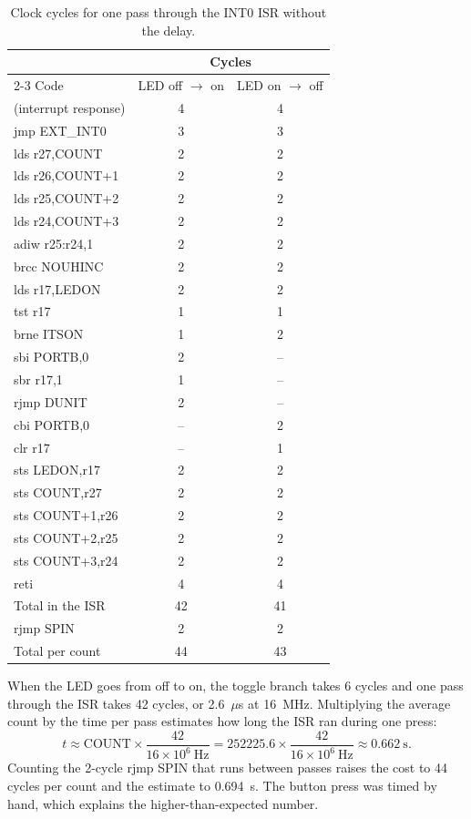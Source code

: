 \documentclass[11pt]{article}
\begin{document}
\begin{table}[H]
  \centering
  \caption{Clock cycles for one pass through the INT0 ISR without the delay.}
  \label{tab:isr}
  \begin{tabular}{lcc}
    \toprule
    & \multicolumn{2}{c}{Cycles} \\
    \cmidrule(l){2-3}
    Code & LED off $\to$ on & LED on $\to$ off \\
    \midrule
    (interrupt response) & 4 & 4 \\
    jmp EXT\_INT0 & 3 & 3 \\
    lds r27,COUNT & 2 & 2 \\
    lds r26,COUNT+1 & 2 & 2 \\
    lds r25,COUNT+2 & 2 & 2 \\
    lds r24,COUNT+3 & 2 & 2 \\
    adiw r25:r24,1 & 2 & 2 \\
    brcc NOUHINC & 2 & 2 \\
    lds r17,LEDON & 2 & 2 \\
    tst r17 & 1 & 1 \\
    brne ITSON & 1 & 2 \\
    sbi PORTB,0 & 2 & -- \\
    sbr r17,1 & 1 & -- \\
    rjmp DUNIT & 2 & -- \\
    cbi PORTB,0 & -- & 2 \\
    clr r17 & -- & 1 \\
    sts LEDON,r17 & 2 & 2 \\
    sts COUNT,r27 & 2 & 2 \\
    sts COUNT+1,r26 & 2 & 2 \\
    sts COUNT+2,r25 & 2 & 2 \\
    sts COUNT+3,r24 & 2 & 2 \\
    reti & 4 & 4 \\
    \midrule
    Total in the ISR & 42 & 41 \\
    rjmp SPIN & 2 & 2 \\
    \midrule
    Total per count & 44 & 43 \\
    \bottomrule
  \end{tabular}
\end{table}

When the LED goes from off to on, the toggle branch takes 6 cycles and one pass through the ISR takes 42 cycles, or 2.6~$\mu$s at 16~MHz. Multiplying the average count by the time per pass estimates how long the ISR ran during one press:
\begin{equation}
  t \approx \text{COUNT} \times \frac{42}{16 \times 10^{6}\ \text{Hz}} = 252225.6 \times \frac{42}{16 \times 10^{6}\ \text{Hz}} \approx 0.662~\text{s}.
\end{equation}
Counting the 2-cycle rjmp SPIN that runs between passes raises the cost to 44 cycles per count and the estimate to 0.694~s. The button press was timed by hand, which explains the higher-than-expected number.
\end{document}
